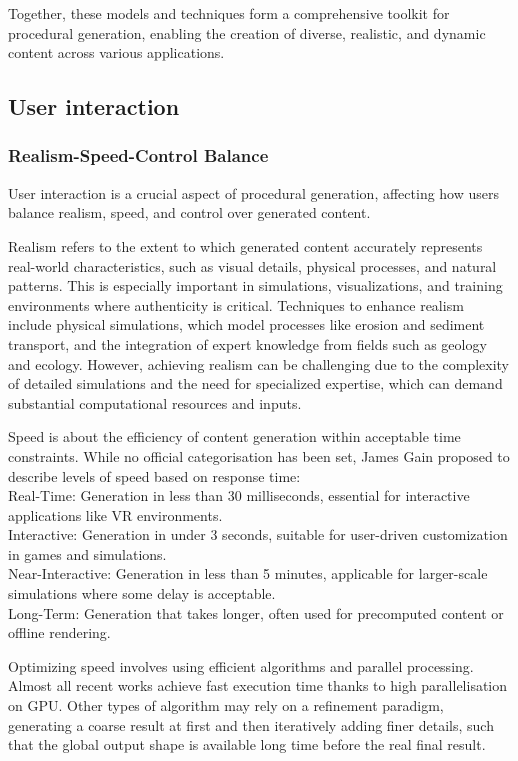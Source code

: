 Together, these models and techniques form a comprehensive toolkit for procedural generation, enabling the creation of diverse, realistic, and dynamic content across various applications.

\subsection{User interaction}
\subsubsection{Realism-Speed-Control Balance}
User interaction is a crucial aspect of procedural generation, affecting how users balance realism, speed, and control over generated content.

Realism refers to the extent to which generated content accurately represents real-world characteristics, such as visual details, physical processes, and natural patterns. This is especially important in simulations, visualizations, and training environments where authenticity is critical. Techniques to enhance realism include physical simulations, which model processes like erosion and sediment transport, and the integration of expert knowledge from fields such as geology and ecology. However, achieving realism can be challenging due to the complexity of detailed simulations and the need for specialized expertise, which can demand substantial computational resources and inputs.

Speed is about the efficiency of content generation within acceptable time constraints. While no official categorisation has been set, James Gain proposed to describe levels of speed based on response time: \\
Real-Time: Generation in less than 30 milliseconds, essential for interactive applications like VR environments. \\
Interactive: Generation in under 3 seconds, suitable for user-driven customization in games and simulations. \\
Near-Interactive: Generation in less than 5 minutes, applicable for larger-scale simulations where some delay is acceptable. \\
Long-Term: Generation that takes longer, often used for precomputed content or offline rendering.

Optimizing speed involves using efficient algorithms and parallel processing. Almost all recent works achieve fast execution time thanks to high parallelisation on GPU. Other types of algorithm may rely on a refinement paradigm, generating a coarse result at first and then iteratively adding finer details, such that the global output shape is available long time before the real final result.

